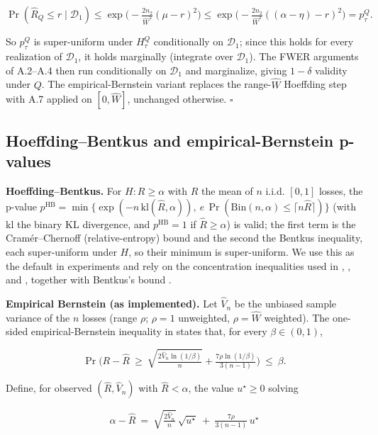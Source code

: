 \documentclass{ieeeaccess}
\begin{document}
\[
\Pr(\hat R_Q\le r\mid\mathcal D_1)\le\exp\!\Big(-\tfrac{2n_2}{\hat W^2}(\mu-r)^2\Big)\le\exp\!\Big(-\tfrac{2n_2}{\hat W^2}((\alpha-\eta)-r)^2\Big)=p^Q_\tau.
\]

So $p^Q_\tau$ is super-uniform under $H^Q_\tau$ conditionally on $\mathcal D_1$; since this holds for every realization of $\mathcal D_1$, it holds marginally (integrate over $\mathcal D_1$). The FWER arguments of A.2--A.4 then run conditionally on $\mathcal D_1$ and marginalize, giving $1-\delta$ validity under $Q$. The empirical-Bernstein variant replaces the range-$\hat W$ Hoeffding step with A.7 applied on $[0,\hat W]$, unchanged otherwise. $\square$

\subsection{Hoeffding--Bentkus and empirical-Bernstein p-values}

\textbf{Hoeffding--Bentkus.} For $H:R\ge\alpha$ with $\hat R$ the mean of $n$ i.i.d. $[0,1]$ losses, the p-value $p^{\mathrm{HB}}=\min\{\exp(-n\,\mathrm{kl}(\hat R,\alpha)),\ e\,\Pr(\mathrm{Bin}(n,\alpha)\le\lceil n\hat R\rceil)\}$ (with $\mathrm{kl}$ the binary KL divergence, and $p^{\mathrm{HB}}=1$ if $\hat R\ge\alpha$) is valid; the first term is the Cram{\'e}r--Chernoff (relative-entropy) bound and the second the Bentkus inequality, each super-uniform under $H$, so their minimum is super-uniform. We use this as the default in experiments and rely on the concentration inequalities used in \cite{bates2021distributionfree}, \cite{angelopoulos2025learn}, and \cite{angelopoulos2024conformal}, together with Bentkus's bound \cite{bentkus2004hoeffding}.

\textbf{Empirical Bernstein (as implemented).} Let $\hat V_n$ be the unbiased sample variance of the $n$ losses (range $\rho$; $\rho=1$ unweighted, $\rho=\hat W$ weighted). The one-sided empirical-Bernstein inequality in \cite{maurer2009empirical} states that, for every $\beta\in(0,1)$,

\begin{equation}
\Pr\Big(R-\hat R\ \ge\ \sqrt{\tfrac{2\hat V_n\ln(1/\beta)}{n}}+\tfrac{7\rho\ln(1/\beta)}{3(n-1)}\Big)\ \le\ \beta. \tag{MP}
\end{equation}

Define, for observed $(\hat R,\hat V_n)$ with $\hat R<\alpha$, the value $u^\star\ge0$ solving

\[
\alpha-\hat R\ =\ \sqrt{\tfrac{2\hat V_n}{n}}\,\sqrt{u^\star}\ +\ \tfrac{7\rho}{3(n-1)}\,u^\star
\]
\end{document}
